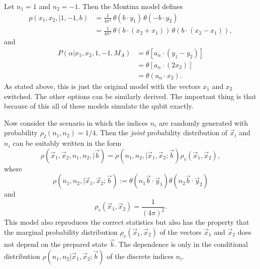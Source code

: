 \documentclass[12pt,draft]{article}
\theoremstyle{definition}
\theoremstyle{plain}
\begin{document}
    {
        \color{red}
        Let $n_1 = 1$ and $n_2 = -1$. Then the Montina model
        defines
        \begin{align}
            p(x_1, x_2, | 1, -1, b)
            &= \frac{1}{4\pi^2} \, 
            \theta(b \cdot y_1) \, \theta(-b \cdot y_2) \\
            &= \frac{1}{4\pi^2} \,
            \theta(b \cdot (x_2 + x_1)) \, 
            \theta(b \cdot (x_2 - x_1)),
        \end{align}
        and
        \begin{align}
            P(\alpha | x_1, x_2, 1, -1, M_A)
            &= \theta\left[
                a_{\alpha} \cdot (y_1 - y_2)
            \right] \\
            &= \theta\left[
                a_\alpha \cdot (2 x_2)
            \right] \\
            &= \theta(a_\alpha \cdot x_2).
        \end{align}
        As stated above, this is just the original model
        with the vectors $x_1$ and $x_2$ switched. The other
        options can be similarly derived. The important
        thing is that because of this all of these models
        simulate the qubit exactly.
    }

    Now consider the scenario in which the indices $n_i$ are
    randomly generated with probability $\rho_I(n_1,n_2) = 1
    / 4$. Then the \textit{joint} probability distribution
    of $\vec x_i$ and $n_i$ can be suitably written in the
    form
    \begin{equation}
        \rho(\vec x_1, \vec x_2, n_1, n_2, | \vec b)
        = \rho(n_1, n_2, | \vec x_1, \vec x_2; \vec b)
        \rho_v(\vec x_1, \vec x_2),
    \end{equation}
    where
    \begin{equation}
        \rho(n_1, n_2, | \vec x_1, \vec x_2; \vec b)
        := \theta(n_1 \vec b \cdot \vec y_1) \theta(n_2 \vec
        b \cdot \vec y_2)
    \end{equation}
    and
    \begin{equation}
        \rho_v(\vec x_1, \vec x_2)
        = \frac{1}{(4\pi)^2}.
    \end{equation}
    This model also reproduces the correct statistics but
    also has the property that the marginal probability
    distribution $\rho_v(\vec x_1, \vec x_2)$ of the vectors
    $\vec x_1$ and $\vec x_2$ does not depend on the
    prepared state $\vec b$. The dependence is only in the
    conditional distribution $\rho(n_1,n_2 | \vec x_1, \vec
    x_2; \vec b)$ of the discrete indices $n_i$.
\end{document}
